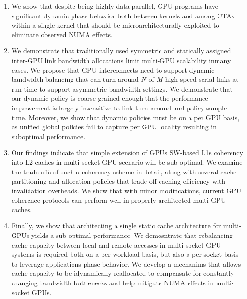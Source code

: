 \begin{enumerate}
\item
We show that despite being highly data parallel, GPU programs have significant
dynamic phase behavior both between kernels and among CTAs within a single
kernel that should be microarchitecturally exploited to eliminate observed
NUMA effects.

\item
We demonstrate that traditionally used symmetric and statically assigned inter-GPU link bandwidth allocations 
limit multi-GPU scalability inmany cases. We propose
that GPU interconnects need to support dynamic bandwidth balancing that can
turn around $N$ of $M$ high speed serial links at run time to support asymmetric
bandwidth settings. We demonstrate that our dynamic policy is coarse
grained enough that the performance improvement is largely insensitive to link turn 
around and policy sample time. Moreover, we show that dynamic policies must be on a
per GPU basis, as unified global policies fail to capture per GPU locality
resulting in suboptimal performance.

\item
Our findings indicate that simple extension of GPUs SW-based L1s coherency into
L2 caches in multi-socket GPU scenario will be sub-optimal.  
We examine the trade-offs of such a coherency scheme in detail, 
along with several cache partitioning and allocation policies that trade-off
caching efficiency with invalidation overheads. We show that with minor modifications, 
current GPU coherence protocols can perform well in properly architected multi-GPU caches.

\item Finally, we show that architecting a single static cache architecture for
multi-GPUs yields a sub-optimal performance. We demosntrate that rebalancing cache
capacity between local and remote accesses in multi-socket GPU systems is
required both on a per workload basis, but also a per socket basis to leverage
applications phase behavior. We develop a mechanims that allows cache capacity
to be idynamically reallocated to compensate for constantly changing bandwidth
bottlenecks and help mitigate NUMA effects in multi-socket GPUs.






\end{enumerate}
